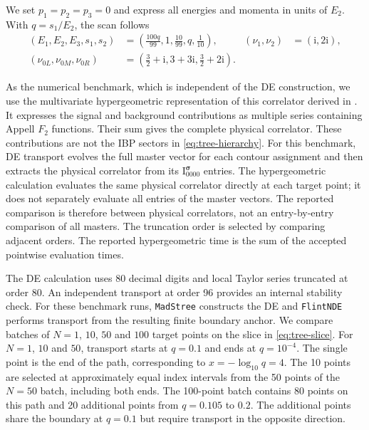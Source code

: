 \documentclass[11pt,a4paper]{article}
\numberwithin{table}{section}
\newcommand{\ii}{\mathrm i}
\begin{document}
We set $p_1=p_2=p_3=0$ and express all energies and momenta in units of $E_2$.
With $q=s_1/E_2$, the scan follows
\begin{equation}
 \begin{aligned}
 (E_1,E_2,E_3,s_1,s_2)
 &=\left(\frac{100q}{99},1,\frac{10}{99},q,\frac{1}{10}\right),
 & (\nu_1,\nu_2)&=(\ii,2\ii),\\
 (\nu_{0L},\nu_{0M},\nu_{0R})
 &=\left(\frac32+\ii,3+3\ii,\frac32+2\ii\right).&&
 \end{aligned}
 \label{eq:tree-slice}
\end{equation}

As the numerical benchmark, which is independent of the DE construction, we use the multivariate
hypergeometric representation of this correlator derived
in \cite{Xianyu:2023ytd}.
It expresses the signal and background contributions as multiple series
containing Appell $F_2$ functions. Their sum gives the complete physical
correlator. These contributions are not the IBP sectors in
\eqref{eq:tree-hierarchy}.
For this benchmark, DE transport evolves the full master vector for each
contour assignment and then extracts the physical correlator from its
$\text{I}^{\boldsymbol\sigma}_{0000}$ entries. The hypergeometric calculation
evaluates the same physical correlator directly at each target point;
it does not separately evaluate all entries of the master vectors.
The reported comparison is therefore between physical correlators,
not an entry-by-entry comparison of all masters.
The truncation order is selected by comparing adjacent orders.
The reported hypergeometric time is the sum of the accepted
pointwise evaluation times.

The DE calculation uses 80 decimal digits and local Taylor series truncated at order 80.
An independent transport at order 96 provides an internal stability check.
For these benchmark runs, \texttt{MadStree} constructs
the DE and \texttt{FlintNDE} performs transport from the resulting finite boundary anchor.
We compare batches of $N=1$, $10$, $50$ and $100$ target points on the slice in \eqref{eq:tree-slice}.
For $N=1$, $10$ and $50$, transport starts at $q=0.1$ and ends at $q=10^{-4}$.
The single point is the end of the path, corresponding to $x=-\log_{10}q=4$.
The 10 points are selected at approximately equal index intervals from the 50 points of the
$N=50$ batch, including both ends.
The 100-point batch contains 80 points on this path and 20 additional points from $q=0.105$ to $0.2$.
The additional points share the boundary at $q=0.1$ but require transport in the opposite direction.
\end{document}
